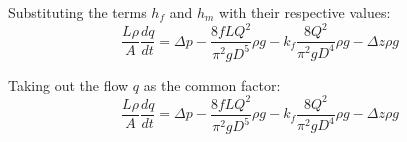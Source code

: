 Substituting the terms $h_f$ and $h_m$ with their respective values:
\begin{equation}
   \frac{L \rho}{A} \frac{dq}{dt} =\Delta p - \frac{8fLQ^2}{\pi^{2}gD^5} \rho g - k_f \frac{8Q^2}{\pi^2gD^4} \rho g - \Delta z \rho g 
\end{equation}

Taking out the flow $q$ as the common factor:
\begin{equation}
\label{FinalPipeModel}
   \frac{L \rho}{A} \frac{dq}{dt} =\Delta p - \frac{8fLQ^2}{\pi^{2}gD^5} \rho g - k_f \frac{8Q^2}{\pi^2gD^4} \rho g - \Delta z \rho g 
\end{equation}
